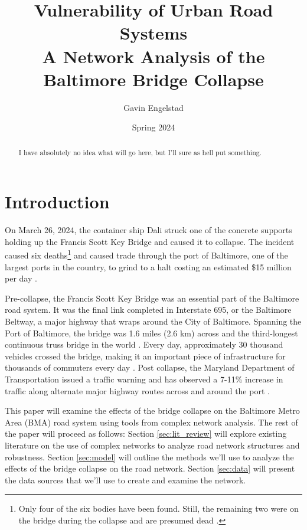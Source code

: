 \documentclass[11pt]{article}
\title{Vulnerability of Urban Road Systems \\ %
    \large A Network Analysis of the Baltimore Bridge Collapse}
\author{Gavin Engelstad}
\date{Spring 2024}
\numberwithin{equation}{section} %
\numberwithin{figure}{section} %
\numberwithin{table}{section} %
\theoremstyle{definition}
\begin{document}
\maketitle

\begin{abstract}
    I have absolutely no idea what will go here, but I'll sure as hell put something.
\end{abstract}

\section{Introduction}

On March 26, 2024, the container ship Dali struck one of the concrete supports holding up the Francis Scott Key Bridge and caused it to collapse. The incident caused six deaths\footnote{Only four of the six bodies have been found. Still, the remaining two were on the bridge during the collapse and are presumed dead \parencite{Hassan24}.} and caused trade through the port of Baltimore, one of the largest ports in the country, to grind to a halt costing an estimated \$15 million per day \parencites{Hassan24}{AlJazeera24}.

Pre-collapse, the Francis Scott Key Bridge was an essential part of the Baltimore road system. It was the final link completed in Interstate 695, or the Baltimore Beltway, a major highway that wraps around the City of Baltimore. Spanning the Port of Baltimore, the bridge was 1.6 miles (2.6 km) across and the third-longest continuous truss bridge in the world \parencite{Parry24}. Every day, approximately 30 thousand vehicles crossed the bridge, making it an important piece of infrastructure for thousands of commuters every day \parencite{MDOT24}. Post collapse, the Maryland Department of Transportation issued a traffic warning and has observed a 7-11\% increase in traffic along alternate major highway routes across and around the port \parencites{MDOT24}{Domen24}.


This paper will examine the effects of the bridge collapse on the Baltimore Metro Area (BMA) road system using tools from complex network analysis. The rest of the paper will proceed as follows: Section \ref{sec:lit_review} will explore existing literature on the use of complex networks to analyze road network structures and robustness. Section \ref{sec:model} will outline the methods we'll use to analyze the effects of the bridge collapse on the road network. Section \ref{sec:data} will present the data sources that we'll use to create and examine the network. %
\end{document}
